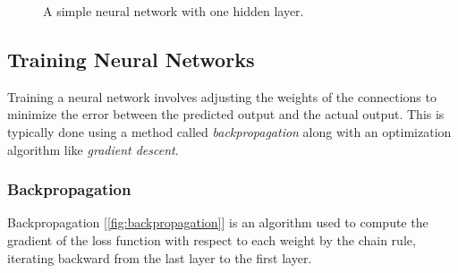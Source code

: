\documentclass{article}
\begin{document}
\begin{figure}[H]
    \centering
    \caption{A simple neural network with one hidden layer.}
    \label{fig:basic-nn}
\end{figure}
\subsection{Training Neural Networks}

Training a neural network involves adjusting the weights of the connections to minimize the error between the predicted output and the actual output. This is typically done using a method called \emph{backpropagation} along with an optimization algorithm like \emph{gradient descent}.

\subsubsection{Backpropagation}

Backpropagation [\autoref{fig:backpropagation}] is an algorithm used to compute the gradient of the loss function with respect to each weight by the chain rule, iterating backward from the last layer to the first layer.
\end{document}
